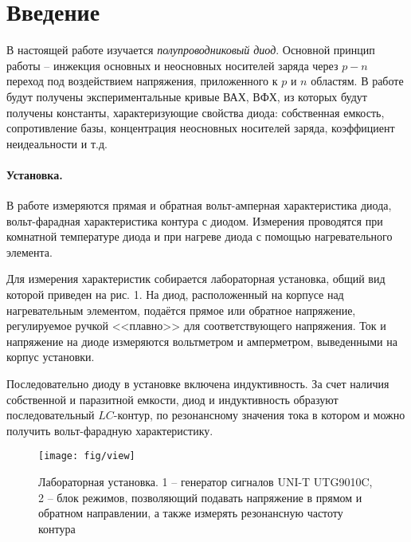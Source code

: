 \documentclass[a4paper,14pt]{extarticle}
\begin{document}


\tableofcontents
\newpage



\section*{Введение}
\vspace{-0.5em}
В настоящей работе изучается \textit{полупроводниковый диод}. Основной принцип работы -- инжекция основных и неосновных носителей заряда через $p-n$ переход под воздействием напряжения, приложенного к $p$ и $n$ областям. В работе будут получены экспериментальные кривые ВАХ, ВФХ, из которых будут получены константы, характеризующие свойства диода: собственная емкость, сопротивление базы, концентрация неосновных носителей заряда, коэффициент неидеальности и т.д.



\vspace{-0.5em}


\paragraph{Установка.} В работе измеряются прямая и обратная вольт-амперная характеристика диода, вольт-фарадная характеристика контура с диодом. Измерения проводятся при комнатной температуре диода и при нагреве диода с помощью нагревательного элемента. 

Для измерения характеристик собирается лабораторная установка, общий вид которой приведен на рис. 1. На диод, расположенный на корпусе над нагревательным элементом, подаётся прямое или обратное напряжение, регулируемое ручкой <<плавно>> для соответствующего напряжения. Ток и напряжение на диоде измеряются вольтметром и амперметром, выведенными на корпус установки. 

Последовательно диоду в установке включена индуктивность. За счет наличия собственной и паразитной емкости, диод и индуктивность образуют последовательный $LC$-контур, по резонансному значения тока в котором и можно получить вольт-фарадную характеристику.

\begin{figure}[H]
	\centering
	\texttt{[image: fig/view]}
	\vspace{-1em}
	\caption{Лабораторная установка. 1 -- генератор сигналов UNI-T UTG9010C, 2 -- блок режимов, позволяющий подавать напряжение в прямом и обратном направлении, а также измерять резонансную частоту контура}
	\label{fig:1}
\end{figure}
\end{document}
